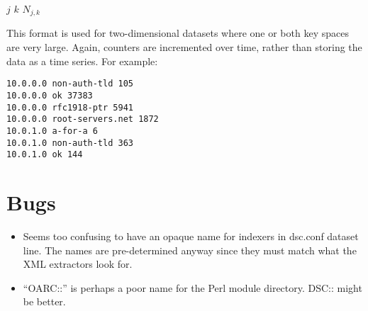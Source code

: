 \documentclass{report}
\begin{document}
\noindent
\begin{tt}$j$ $k$ $N_{j,k}$
\end{tt}

\vspace{1ex}\noindent
This format is used for two-dimensional datasets where one or both
key spaces are very large.  Again, counters are incremented over
time, rather than storing the data as a time series.
For example:

\begin{verbatim}
10.0.0.0 non-auth-tld 105
10.0.0.0 ok 37383
10.0.0.0 rfc1918-ptr 5941
10.0.0.0 root-servers.net 1872
10.0.1.0 a-for-a 6
10.0.1.0 non-auth-tld 363
10.0.1.0 ok 144
\end{verbatim}

\chapter{Bugs}

\begin{itemize}

\item
	Seems too confusing to have an opaque name for indexers in
	dsc.conf dataset line.  The names are pre-determined anyway
	since they must match what the XML extractors look for.

\item
	``OARC::'' is perhaps a poor name for the Perl module
	directory.  DSC:: might be better.

\end{itemize}
\end{document}
